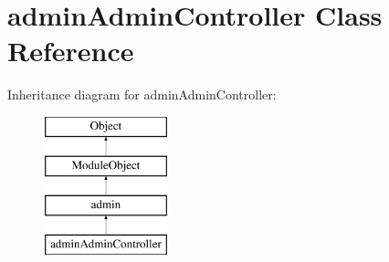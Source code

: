 \hypertarget{classadminAdminController}{}\section{admin\+Admin\+Controller Class Reference}
\label{classadminAdminController}
Inheritance diagram for admin\+Admin\+Controller\+:\begin{figure}[H]
\begin{center}
\leavevmode
\includegraphics[height=4.000000cm]{classadminAdminController}
\end{center}
\end{figure}
